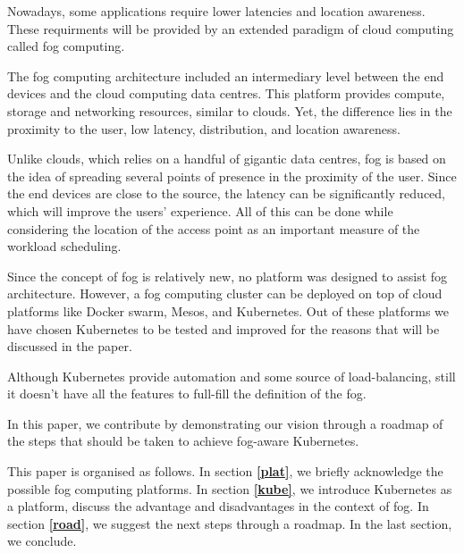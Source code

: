\documentclass[letterpaper,twocolumn,10pt]{article}
\let\origref\ref
\def\ref#1{\textbf{\origref{#1}}}
\begin{document}
Nowadays, some applications require lower latencies and location awareness. These requirments will be provided by an extended paradigm of cloud computing called fog computing\cite{bonomi2011connected,Bonomi:2012:FCR:2342509.2342513}.

The fog computing architecture included an intermediary level between the end devices and the cloud computing data centres. This platform provides compute, storage and networking resources, similar to clouds. Yet, the difference lies in the proximity to the user, low latency, distribution, and location awareness. 

Unlike clouds, which relies on a handful of gigantic data centres, fog is based on the idea of spreading several points of presence in the proximity of the user. Since the end devices are close to the source, the latency can be significantly reduced, which will improve the users' experience. All of this can be done while considering the location of the access point as an important measure of the workload scheduling.

Since the concept of fog is relatively new, no platform was designed to assist fog architecture. However, a fog computing cluster can be deployed on top of cloud platforms like Docker swarm, Mesos, and Kubernetes. Out of these platforms we have chosen Kubernetes to be tested and improved for the reasons that will be discussed in the paper.

Although Kubernetes provide automation and some source of load-balancing, still it doesn't have all the features to full-fill the definition of the fog.    

In this paper, we contribute by demonstrating our vision through a roadmap of the steps that should be taken to achieve fog-aware Kubernetes.


This paper is organised as follows. In section \ref{plat}, we briefly acknowledge the possible fog computing platforms. In section \ref{kube}, we introduce Kubernetes as a platform, discuss the advantage and disadvantages in the context of fog. In section 
\ref{road}, we suggest the next steps through a roadmap. In the last section, we conclude.


\end{document}
